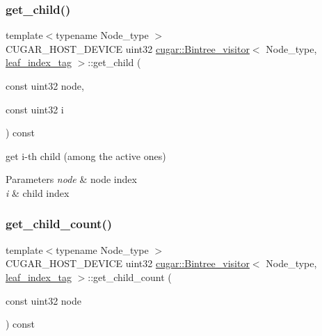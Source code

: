 \subsubsection{\texorpdfstring{get\+\_\+child()}{get\_child()}}
{\footnotesize\ttfamily template$<$typename Node\+\_\+type $>$ \\
C\+U\+G\+A\+R\+\_\+\+H\+O\+S\+T\+\_\+\+D\+E\+V\+I\+CE uint32 \hyperlink{structcugar_1_1_bintree__visitor}{cugar\+::\+Bintree\+\_\+visitor}$<$ Node\+\_\+type, \hyperlink{structcugar_1_1leaf__index__tag}{leaf\+\_\+index\+\_\+tag} $>$\+::get\+\_\+child (\begin{DoxyParamCaption}\item[{const uint32}]{node,  }\item[{const uint32}]{i }\end{DoxyParamCaption}) const\hspace{0.3cm}{\ttfamily [inline]}}

get i-\/th child (among the active ones)


\begin{DoxyParams}{Parameters}
{\em node} & node index \\
\hline
{\em i} & child index \\
\hline
\end{DoxyParams}
\mbox{\label{structcugar_1_1_bintree__visitor_3_01_node__type_00_01leaf__index__tag_01_4_a4779f532c93ec1ed1e38aba2ec8bacf8}} 
\subsubsection{\texorpdfstring{get\+\_\+child\+\_\+count()}{get\_child\_count()}}
{\footnotesize\ttfamily template$<$typename Node\+\_\+type $>$ \\
C\+U\+G\+A\+R\+\_\+\+H\+O\+S\+T\+\_\+\+D\+E\+V\+I\+CE uint32 \hyperlink{structcugar_1_1_bintree__visitor}{cugar\+::\+Bintree\+\_\+visitor}$<$ Node\+\_\+type, \hyperlink{structcugar_1_1leaf__index__tag}{leaf\+\_\+index\+\_\+tag} $>$\+::get\+\_\+child\+\_\+count (\begin{DoxyParamCaption}\item[{const uint32}]{node }\end{DoxyParamCaption}) const\hspace{0.3cm}{\ttfamily [inline]}}

